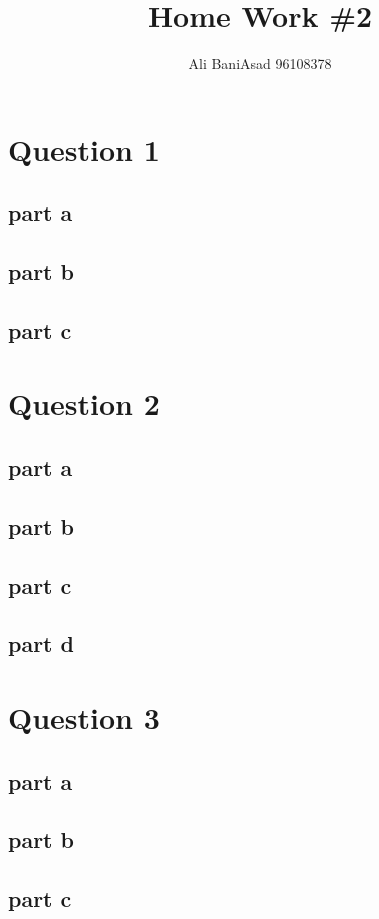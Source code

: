 \documentclass{article}
\title{Home Work \#2}
\author{Ali BaniAsad 96108378}
\begin{document}
	\maketitle
	\section{Question 1}
	
	\subsection{part a}
	
	\subsection{part b}\label{Q1_b}
	
	\subsection{part c}
	
	\section{Question 2}
	\subsection{part a}
	
	\subsection{part b}
	
	\subsection{part c}
	
	\subsection{part d}
	
	\section{Question 3}
	
	\subsection{part a}
	
	\subsection{part b}
	
	\subsection{part c}
	
	\newpage
	\tableofcontents
\end{document}
